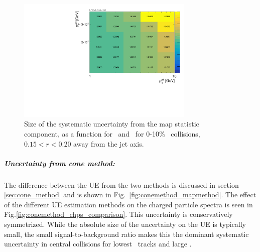 \begin{figure}[h]
    \centerline{
       \includegraphics[width=0.75\textwidth]{figures/main/systematics/map_stat_size}
    }
    \caption{Size of the systematic uncertainty from the map statistic component, as a function for \pttrk\ and \ptjet\ for 0-10\% \pbpb\ collisions, $0.15 < r < 0.20$ away from the jet axis.}
    \label{fig:mapstat_corr}
 \end{figure}




\subparagraph{Uncertainty from cone method:} The difference between the UE from the two methods is discussed in section \ref{sec:cone_method} and is shown in Fig.~\ref{fig:conemethod_mapmethod}.
The effect of the different UE estimation methods on the charged particle spectra is seen in Fig.\ref{fig:conemethod_chps_comparison}.
This uncertainty is conservatively symmetrized.
While the absolute size of the uncertainty on the UE is typically small, the small signal-to-background ratio makes this the dominant systematic uncertainty in central collisions for lowest \pT\ tracks and large \rvar.

